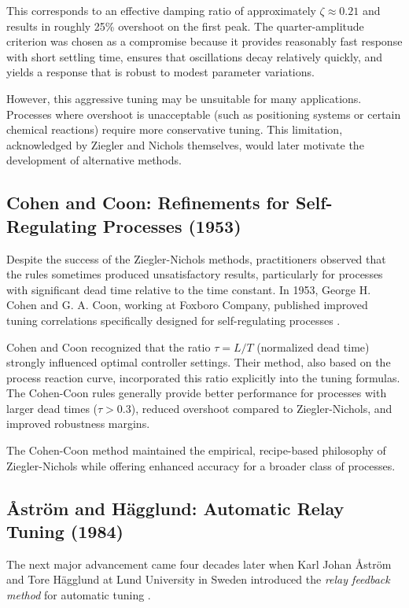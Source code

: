 This corresponds to an effective damping ratio of approximately $\zeta \approx 0.21$ and results in roughly 25\% overshoot on the first peak. The quarter-amplitude criterion was chosen as a compromise because it provides reasonably fast response with short settling time, ensures that oscillations decay relatively quickly, and yields a response that is robust to modest parameter variations.

However, this aggressive tuning may be unsuitable for many applications. Processes where overshoot is unacceptable (such as positioning systems or certain chemical reactions) require more conservative tuning. This limitation, acknowledged by Ziegler and Nichols themselves, would later motivate the development of alternative methods.

\subsection{Cohen and Coon: Refinements for Self-Regulating Processes (1953)}

Despite the success of the Ziegler-Nichols methods, practitioners observed that the rules sometimes produced unsatisfactory results, particularly for processes with significant dead time relative to the time constant. In 1953, George H. Cohen and G. A. Coon, working at Foxboro Company, published improved tuning correlations specifically designed for self-regulating processes \cite{cohen1953}.

Cohen and Coon recognized that the ratio $\tau = L/T$ (normalized dead time) strongly influenced optimal controller settings. Their method, also based on the process reaction curve, incorporated this ratio explicitly into the tuning formulas. The Cohen-Coon rules generally provide better performance for processes with larger dead times ($\tau > 0.3$), reduced overshoot compared to Ziegler-Nichols, and improved robustness margins.

The Cohen-Coon method maintained the empirical, recipe-based philosophy of Ziegler-Nichols while offering enhanced accuracy for a broader class of processes.

\subsection{\AA{}str\"om and H\"agglund: Automatic Relay Tuning (1984)}

The next major advancement came four decades later when Karl Johan \AA{}str\"om and Tore H\"agglund at Lund University in Sweden introduced the \textit{relay feedback method} for automatic tuning \cite{astrom1984}.

